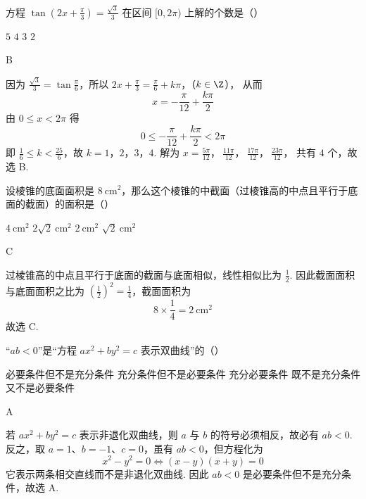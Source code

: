 \documentclass[UTF8,a4paper,oneside,11pt]{ctexbook}
\begin{document}
\begin{problem}
方程 \(\tan\left(2x+\frac{\pi}{3}\right)=\frac{\sqrt{3}}{3}\) 在区间 \([0,2\pi)\) 上解的个数是（\quad）

\choices
    {\(5\)}
    {\(4\)}
    {\(3\)}
    {\(2\)}
\end{problem}

\begin{answer}
B
\end{answer}

\begin{solution}
因为 \(\frac{\sqrt{3}}{3}=\tan\frac{\pi}{6}\)，所以
\(2x+\frac{\pi}{3}=\frac{\pi}{6}+k\pi\)，（\(k\in\Z\)），
从而
\[
x=-\frac{\pi}{12}+\frac{k\pi}{2}
\]
由 \(0\leqslant x<2\pi\) 得
\[
0\leqslant-\frac{\pi}{12}+\frac{k\pi}{2}<2\pi
\]
即 \(\frac{1}{6}\leqslant k<\frac{25}{6}\)，故 \(k=1\)，\(2\)，\(3\)，\(4\). 解为
\(x=\frac{5\pi}{12}\)，\(\ \frac{11\pi}{12}\)，\(\ \frac{17\pi}{12}\)，\(\ \frac{23\pi}{12}\)，
共有 \(4\) 个，故选 B.
\end{solution}

\begin{problem}
设棱锥的底面面积是 \(8\mathrm{~cm}^2\)，那么这个棱锥的中截面（过棱锥高的中点且平行于底面的截面）的面积是（\quad）

\choices
    {\(4\mathrm{~cm}^2\)}
    {\(2\sqrt{2}\mathrm{~cm}^2\)}
    {\(2\mathrm{~cm}^2\)}
    {\(\sqrt{2}\mathrm{~cm}^2\)}
\end{problem}

\begin{answer}
C
\end{answer}

\begin{solution}
过棱锥高的中点且平行于底面的截面与底面相似，线性相似比为 \(\frac{1}{2}\). 因此截面面积与底面面积之比为 \(\left(\frac{1}{2}\right)^2=\frac{1}{4}\)，截面面积为
\[
8\times\frac{1}{4}=2\mathrm{~cm}^2
\]
故选 C.
\end{solution}

\begin{problem}
“\(ab<0\)”是“方程 \(ax^2+by^2=c\) 表示双曲线”的（\quad）

\choices
    {必要条件但不是充分条件}
    {充分条件但不是必要条件}
    {充分必要条件}
    {既不是充分条件又不是必要条件}
\end{problem}

\begin{answer}
A
\end{answer}

\begin{solution}
若 \(ax^2+by^2=c\) 表示非退化双曲线，则 \(a\) 与 \(b\) 的符号必须相反，故必有 \(ab<0\). 反之，取 \(a=1\)、\(b=-1\)、\(c=0\)，虽有 \(ab<0\)，但方程化为
\[
x^2-y^2=0\iff (x-y)(x+y)=0
\]
它表示两条相交直线而不是非退化双曲线. 因此 \(ab<0\) 是必要条件但不是充分条件，故选 A.
\end{solution}
\end{document}
